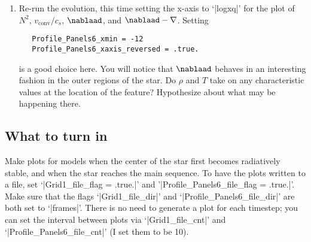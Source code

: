 \begin{exercisebox}
\begin{enumerate}
\item Re-run the evolution, this time setting the x-axis to `|logxq|' for the plot of $N^{2}$, $v_{\mathrm{conv}}/c_{s}$, $\nablaad$, and $\nablaad-\nabla$.  Setting
\begin{Verbatim}
   Profile_Panels6_xmin = -12
   Profile_Panels6_xaxis_reversed = .true.
\end{Verbatim}
is a good choice here. You will notice that $\nablaad$ behaves in an interesting fashion in the outer regions of the star.  Do $\rho$ and $T$ take on any characteristic values at the location of the feature?  Hypothesize about what may be happening there.
\end{enumerate}
\end{exercisebox}

\subsection{What to turn in}
Make plots for models when the center of the star first becomes radiatively stable, and when the star reaches the main sequence.  To have the plots written to a file, set
`|Grid1_file_flag = .true.|' and '|Profile_Panels6_file_flag = .true.|'.  Make sure that the flags `|Grid1_file_dir|' and `|Profile_Panels6_file_dir|' are both set to `|frames|'.  There is no need to generate a plot for each timestep; you can set the interval between plots via `|Grid1_file_cnt|' and `|Profile_Panels6_file_cnt|' (I set them to be 10).

\UndefineShortVerb{\|}
